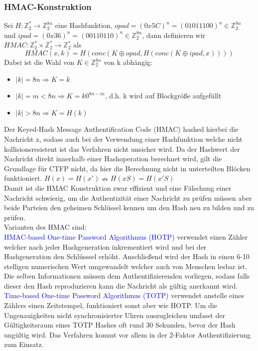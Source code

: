 \documentclass[a4paper,12pt]{article}
\newcommand{\blue}[1]{\textcolor{blue}{#1}}
\begin{document}
\subsubsection{HMAC-Konstruktion}
Sei $H: \mathbb{Z}_2^*\rightarrow\mathbb{Z}_2^{8n}$ eine Hashfunktion, $opad = (0x5C)^n=(01011100)^n\in \mathbb{Z}_2^{8n}$\\
und $ipad=(0x36)^n=(00110110)^n\in \mathbb{Z}_2^{8n}$, dann definieren wir $HMAC:\mathbb{Z}_2^*\times\mathbb{Z}_2^*\rightarrow\mathbb{Z}_2^*$ als
$$HMAC(x,k)=H\left( conc\left( K\oplus opad, H\left( conc\left( K\oplus ipad,x\right)\right)\right)\right)$$
Dabei ist die Wahl von $K\in\mathbb{Z}_2^{8n}$ von k abhängig:
\begin{itemize}
\item $|k|=8n\Rightarrow K=k$
\item $|k|=m<8n\Rightarrow K = k0^{8n-m}$, d.h. k wird auf Blockgröße aufgefüllt
\item $|k|>8n\Rightarrow K = H(k)$
\end{itemize}
Der Keyed-Hash Message Authentification Code (HMAC) hashed hierbei die Nachricht x, sodass auch bei der Verwendung einer Hashfunktion welche nicht kollisionsresistent ist das Verfahren nicht unsicher wird. Da der Hashwert der Nachricht direkt innerhalb einer Hashoperation berechnet wird, gilt die Grundlage für CTFP nicht, da hier die Berechnung nicht in unterteilten Blöcken funktioniert. $H(x)=H(x')\nRightarrow H(xS)=H(x'S)$\\
Damit ist die HMAC Konstruktion zwar effizient und eine Fälschung einer Nachricht schwierig, um die Authentizität einer Nachricht zu prüfen müssen aber beide Parteien den geheimen Schlüssel kennen um den Hash neu zu bilden und zu prüfen.\\
Varianten des HMAC sind:\\
\blue{HMAC-based One-time Password Algorithmus (HOTP)} verwendet einen Zähler welcher nach jeder Hashgeneration inkrementiert wird und bei der Hashgeneration den Schlüsssel erhöht. Anschließend wird der Hash in einen 6-10 stelligen numerischen Wert umgewandelt welcher auch von Menschen lesbar ist. Die selben Informationen müssen dem Authentifizierenden vorliegen, sodass falls dieser den Hash reproduzieren kann die Nachricht als gültig anerkannt wird. \\
\blue{Time-based One-time Password Algorithmus (TOTP)} verwendet anstelle eines Zählers einen Zeitstempel, funktioniert sonst aber wie HOTP. Um die Ungenauigkeiten nicht synchronisierter Uhren auszugleichen umfasst der Gültigkeitsraum eines TOTP Hashes oft rund 30 Sekunden, bevor der Hash ungültig wird. Das Verfahren kommt vor allem in der 2-Faktor Authentifizierung zum Einsatz.
\end{document}
